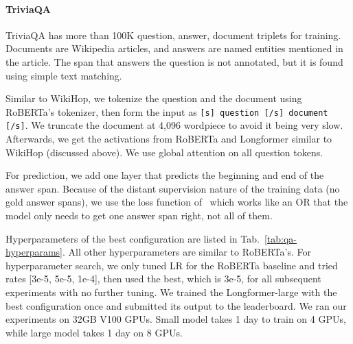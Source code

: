 \documentclass[11pt,a4paper]{article}
\newcommand{\model}{Longformer\xspace}
\begin{document}
\paragraph{TriviaQA}
TriviaQA has more than 100K question, answer, document triplets for training. 
Documents are Wikipedia articles, and answers are named entities 
mentioned in the article. The span that answers the question is not annotated, 
but it is found using simple text matching. 

Similar to WikiHop, we tokenize the question and the document 
using RoBERTa's tokenizer, then form the input as \texttt{[s] question [/s] 
document [/s]}. We truncate the document at 4,096 wordpiece to avoid 
it being very slow. Afterwards, we get the activations from RoBERTa 
and Longformer similar to WikiHop (discussed above). 
We use global attention on all question tokens. 

For prediction, we add one layer that predicts the beginning and end of 
the answer span. Because of the distant supervision nature of the training data (no gold answer spans), we use the loss function of~\citet{Clark2017SimpleAE}
which works like an OR that the model only needs to get 
one answer span right, not all of them. 

Hyperparameters of the best configuration are listed in Tab.~\ref{tab:qa-hyperparams}. All other hyperparameters are similar to RoBERTa's. For hyperparameter search, we only tuned LR for the RoBERTa
baseline and tried rates [3e-5, 5e-5, 1e-4], then used the best, which is 3e-5, 
for all subsequent experiments with no further tuning. 
We trained the \model-large with the best configuration once and submitted its 
output to the leaderboard. 
We ran our experiments on 32GB V100 GPUs.
Small model takes 1 day to train on 4 GPUs, while large model takes 
1 day on 8 GPUs. 
\end{document}
